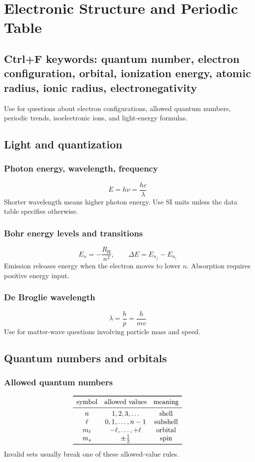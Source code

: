 \section{Electronic Structure and Periodic Table}

\subsection{Ctrl+F keywords: quantum number, electron configuration, orbital, ionization energy, atomic radius, ionic radius, electronegativity}
Use for questions about electron configurations, allowed quantum numbers, periodic trends, isoelectronic ions, and light-energy formulas.

\subsection{Light and quantization}

\subsubsection{Photon energy, wavelength, frequency}
\[
E=h\nu=\frac{hc}{\lambda}
\]
Shorter wavelength means higher photon energy. Use SI units unless the data table specifies otherwise.

\subsubsection{Bohr energy levels and transitions}
\[
E_n=-\frac{R_{\mathrm H}}{n^2}, \qquad \Delta E=E_{n_f}-E_{n_i}
\]
Emission releases energy when the electron moves to lower \(n\). Absorption requires positive energy input.

\subsubsection{De Broglie wavelength}
\[
\lambda=\frac{h}{p}=\frac{h}{mv}
\]
Use for matter-wave questions involving particle mass and speed.

\subsection{Quantum numbers and orbitals}

\subsubsection{Allowed quantum numbers}
\[
\begin{array}{c c c}
\toprule
\text{symbol} & \text{allowed values} & \text{meaning}\\
\midrule
n & 1,2,3,\ldots & \text{shell}\\
\ell & 0,1,\ldots,n-1 & \text{subshell}\\
m_\ell & -\ell,\ldots,+\ell & \text{orbital}\\
m_s & \pm \frac12 & \text{spin}\\
\bottomrule
\end{array}
\]
Invalid sets usually break one of these allowed-value rules.

